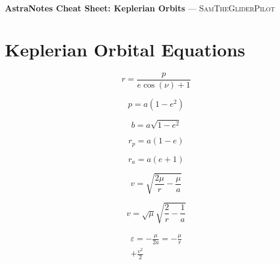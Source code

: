 \documentclass[10pt]{article}
\begin{document}
\vspace*{-1.5em}
{\small
\noindent
\textbf{AstraNotes Cheat Sheet: Keplerian Orbits} \quad --- \quad \textsc{SamTheGliderPilot}
}
\vspace{1em}
\section*{Keplerian Orbital Equations}
\setlength{\parskip}{0pt}
\setlength{\parindent}{0pt}
\setlength{\abovedisplayskip}{2pt}
\setlength{\belowdisplayskip}{2pt}
\noindent\begin{minipage}[t]{0.2487\textwidth}
\[r = \frac{p}{e \cos{\left(\nu \right)} + 1}\]
\end{minipage}%
\begin{minipage}[t]{0.2487\textwidth}
\[p = a \left(1 - e^{2}\right)\]
\end{minipage}%
\begin{minipage}[t]{0.2487\textwidth}
\[b = a \sqrt{1 - e^{2}}\]
\end{minipage}%
\begin{minipage}[t]{0.2487\textwidth}
\[r_{p} = a \left(1 - e\right)\]
\end{minipage}
\par\smallskip
\noindent\begin{minipage}[t]{0.2487\textwidth}
\[r_{a} = a \left(e + 1\right)\]
\end{minipage}%
\begin{minipage}[t]{0.2487\textwidth}
\[v = \sqrt{\frac{2 \mu}{r} - \frac{\mu}{a}}\]
\end{minipage}%
\begin{minipage}[t]{0.2487\textwidth}
\[v = \sqrt{\mu} \sqrt{\frac{2}{r} - \frac{1}{a}}\]
\end{minipage}%
\begin{minipage}[t]{0.2487\textwidth}
\[\begin{aligned}\varepsilon = - \frac{\mu}{2 a} = - \frac{\mu}{r} \\ + \frac{v^{2}}{2}\end{aligned}\]
\end{minipage}
\end{document}
